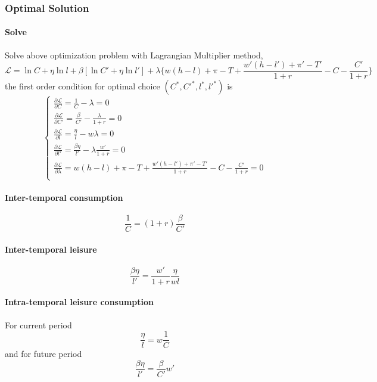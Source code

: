 \documentclass[11pt]{article}
\begin{document}
			\subsubsection{Optimal Solution}
			\paragraph{Solve} Solve above optimization problem with Lagrangian Multiplier method,
			\begin{equation}
				\mathcal{L} = \ln{C} + \eta \ln{l} + \beta[\ln{C'} + \eta \ln{l'}] + \lambda \big \{ w(h - l) + \pi - T + \frac{w'(h - l') + \pi' - T'}{1 + r} - C - \frac{C'}{1+r} \big \}
			\end{equation}
			the first order condition for optimal choice $(C^*, C'^*, l^*, l'^*)$ is
			\begin{equation}
				\begin{cases}
					\frac{\partial \mathcal{L}}{\partial C} = \frac{1}{C} - \lambda = 0 \\
					\frac{\partial \mathcal{L}}{\partial C'} = \frac{\beta}{C'} - \frac{\lambda}{1+r} = 0 \\
					\frac{\partial \mathcal{L}}{\partial l} = \frac{\eta}{l} - w\lambda = 0 \\
					\frac{\partial \mathcal{L}}{\partial l'} = \frac{\beta \eta}{l'} - \lambda \frac{w'}{1+r} = 0 \\
					\frac{\partial \mathcal{L}}{\partial \lambda} = w(h - l) + \pi - T + \frac{w'(h - l') + \pi' - T'}{1 + r} - C - \frac{C'}{1+r} = 0 \\
				\end{cases}
			\end{equation}
			\paragraph{Inter-temporal consumption}
			\begin{equation}
				\frac{1}{C} = (1+r)\frac{\beta}{C'}
			\end{equation}
			
			\paragraph{Inter-temporal leisure}
			\begin{equation}
				\frac{\beta \eta}{l'} = \frac{w'}{1+r} \frac{\eta}{w l}
			\end{equation}
			
			\paragraph{Intra-temporal leisure consumption}
			For current period
			\begin{equation}
				\frac{\eta}{l} = w \frac{1}{C}
			\end{equation}
			and for future period
			\begin{equation}
				\frac{\beta \eta}{l'} = \frac{\beta}{C'} w'
			\end{equation}
			
\end{document}
